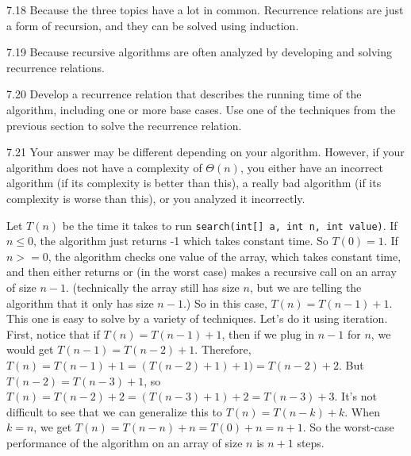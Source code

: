\begin{RequAnswer}{7.18}
Because the three topics have a lot in common. Recurrence relations are just a form of recursion, and
they can be solved using induction.
\end{RequAnswer}
\begin{RequAnswer}{7.19}
Because recursive algorithms are often analyzed by developing and solving recurrence relations.
\end{RequAnswer}
\begin{RequAnswer}{7.20}
Develop a recurrence relation that describes the running time of the algorithm, including one or more base cases.
Use one of the techniques from the previous section to solve the recurrence relation.
\end{RequAnswer}
\begin{RequAnswer}{7.21}
Your answer may be different depending on your algorithm.
However, if your algorithm does not have a complexity of $\Theta(n)$,
you either have an incorrect algorithm (if its complexity is better than this),
a really bad algorithm (if its complexity is worse than this), or you analyzed it incorrectly.

Let $T(n)$ be the time it takes to run \verb+search(int[] a, int n, int value)+.
If $n\leq 0$, the algorithm just returns -1 which takes constant time. So $T(0)=1$.
If $n>=0$, the algorithm checks one value of the array, which takes constant time,
and then either returns or (in the worst case) makes a recursive call on an array of size $n-1$.
(technically the array still has size $n$, but we are telling the algorithm that it only has size $n-1$.)
So in this case, $T(n)=T(n-1)+1$.
This one is easy to solve by a variety of techniques. Let's do it using iteration.
First, notice that if $T(n)=T(n-1)+1$, then if we plug in $n-1$ for $n$, we would get $T(n-1)=T(n-2)+1$.
Therefore, $T(n)=T(n-1)+1=(T(n-2)+1) + 1)= T(n-2)+2$.
But $T(n-2)=T(n-3)+1$, so $T(n)=T(n-2)+2=(T(n-3)+1)+2=T(n-3)+3$.
It's not difficult to see that we can generalize this to $T(n)=T(n-k)+k$.
When $k=n$, we get $T(n)=T(n-n)+n= T(0)+n = n+1$.
So the worst-case performance of the algorithm on an array of size $n$ is $n+1$ steps.
\end{RequAnswer}
